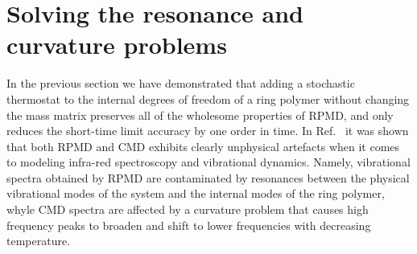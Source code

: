 \documentclass[aps,prb,superscriptaddress,amsmath,amssymb,showpacs,twocolumn]{revtex4}
\begin{document}
%
%
%

\section{Solving the resonance and curvature problems}

In the previous section we have demonstrated that adding a stochastic thermostat to the internal degrees of freedom
of a ring polymer without changing the mass matrix preserves all of the wholesome properties of RPMD, and only reduces
the short-time limit accuracy by one order in time. In Ref.~\cite{witt+09jcp} it was shown that both RPMD and CMD 
exhibits clearly unphysical artefacts when it comes to modeling infra-red spectroscopy and vibrational dynamics. 
Namely, vibrational spectra obtained by RPMD are contaminated by resonances between the physical vibrational modes
of the system and the internal modes of the ring polymer, whyle CMD spectra are affected by a curvature problem that
causes high frequency peaks to broaden and shift to lower frequencies with decreasing temperature. 
\end{document}

